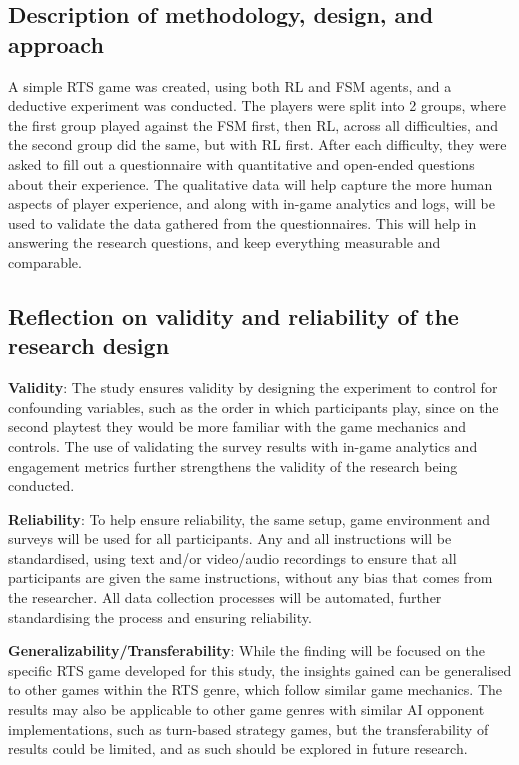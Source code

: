 \documentclass[conference]{IEEEtran}
\begin{document}
\subsection{Description of methodology, design, and approach}

A simple RTS game was created, using both RL and FSM agents, and a deductive experiment was conducted. The players were split into 2 groups,
where the first group played against the FSM first, then RL, across all difficulties, and the second group did the same, but with RL first.
After each difficulty, they were asked to fill out a questionnaire with quantitative and open-ended questions about their experience.
The qualitative data will help capture the more human aspects of player experience, and along with in-game analytics and logs, 
will be used to validate the data gathered from the questionnaires. This will help in answering the research questions, and keep everything measurable and comparable.

\subsection{Reflection on validity and reliability of the research design}

\textbf{Validity}: The study ensures validity by designing the experiment to control for confounding variables, such as the order in which participants play, since on the second playtest they would be more
familiar with the game mechanics and controls. The use of validating the survey results with in-game analytics and engagement metrics further strengthens the validity of the research being conducted.

\textbf{Reliability}: To help ensure reliability, the same setup, game environment and surveys will be used for all participants. Any and all instructions will be standardised, using text and/or video/audio
recordings to ensure that all participants are given the same instructions, without any bias that comes from the researcher. All data collection processes will be automated, further standardising the process
and ensuring reliability.

\textbf{Generalizability/Transferability}: While the finding will be focused on the specific RTS game developed for this study, the insights gained can be generalised to other games within the RTS genre,
which follow similar game mechanics. The results may also be applicable to other game genres with similar AI opponent implementations, such as turn-based strategy games, but the transferability
of results could be limited, and as such should be explored in future research.
\end{document}

